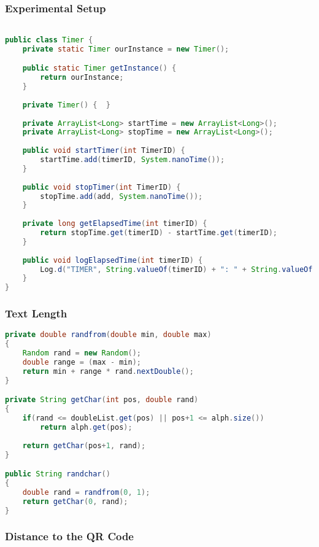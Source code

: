 \subsubsection{Experimental Setup}



\begin{lstlisting}[language=Java, caption={The Timer class}, label=todo]

public class Timer {
	private static Timer ourInstance = new Timer();

	public static Timer getInstance() {
		return ourInstance;
	}
	
	private Timer() {  }
	
	private ArrayList<Long> startTime = new ArrayList<Long>();
	private ArrayList<Long> stopTime = new ArrayList<Long>();
	
	public void startTimer(int TimerID) {
		startTime.add(timerID, System.nanoTime());
	}
	
	public void stopTimer(int TimerID) {
		stopTime.add(add, System.nanoTime());
	}
	
	private long getElapsedTime(int timerID) {
		return stopTime.get(timerID) - startTime.get(timerID);
	}
	
	public void logElapsedTime(int timerID) {
		Log.d("TIMER", String.valueOf(timerID) + ": " + String.valueOf(getElapsedTime(timerID)) + " nano seconds");
	}
}

\end{lstlisting}

\subsubsection{Text Length}
\begin{lstlisting}[language=Java, caption={The randomizer class}, label=todo]
private double randfrom(double min, double max)
{
	Random rand = new Random();
	double range = (max - min);
	return min + range * rand.nextDouble();
}

private String getChar(int pos, double rand)
{
	if(rand <= doubleList.get(pos) || pos+1 <= alph.size())
		return alph.get(pos);
		
	return getChar(pos+1, rand);
}

public String randchar()
{
	double rand = randfrom(0, 1);
	return getChar(0, rand);
}
\end{lstlisting}

\subsubsection{Distance to the QR Code}

